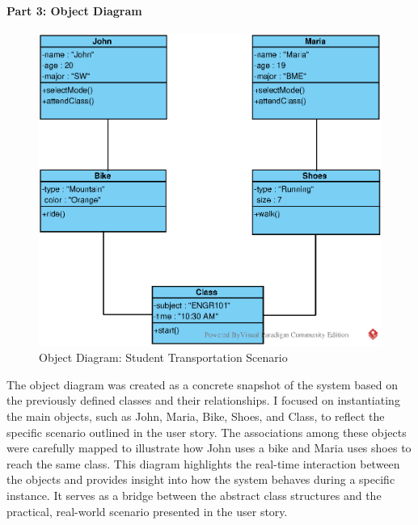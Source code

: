 \vspace{1cm} %

\paragraph*{Part 3: Object Diagram}
\begin{figure}[H]
    \centering
    \includegraphics[width=\textwidth]{images/EPS/ex3-5_part3.eps}
    \caption{Object Diagram: Student Transportation Scenario}
    \label{fig:ex3-5_part3}
\end{figure}

The object diagram was created as a concrete snapshot of the system based on the previously defined classes and their relationships. I focused on instantiating the main objects, such as John, Maria, Bike, Shoes, and Class, to reflect the specific scenario outlined in the user story. The associations among these objects were carefully mapped to illustrate how John uses a bike and Maria uses shoes to reach the same class. This diagram highlights the real-time interaction between the objects and provides insight into how the system behaves during a specific instance. It serves as a bridge between the abstract class structures and the practical, real-world scenario presented in the user story.

\vspace{1cm} %

